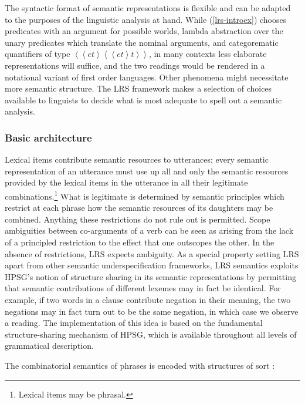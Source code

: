 \documentclass[output=paper]{langsci/langscibook}
\begin{document}

The syntactic format of semantic representations is flexible and can be adapted to the purposes of the linguistic analysis at hand. While (\ref{lrs-introex}) chooses predicates with an argument for possible worlds, lambda abstraction over the unary predicates which translate the nominal arguments, and categorematic quantifiers of type ${\left<\left<et\right>\left<\left<et\right>t\right>\right>}$, in many contexts less elaborate representations will suffice, and the two readings would be rendered in a notational variant of first order languages. Other phenomena might necessitate more semantic structure. The LRS framework makes a selection of choices available to linguists to decide what is most adequate to spell out a semantic analysis.


\subsubsection{Basic architecture}

Lexical items contribute semantic resources to utterances; every semantic representation of an utterance must use up all and only the semantic resources provided by the lexical items in the utterance in all their legitimate combinations.\footnote{Lexical items may be phrasal.} What is legitimate is determined by semantic principles which restrict at each phrase how the semantic resources of its daughters may be combined. Anything these restrictions do not rule out is permitted. Scope ambiguities between co-arguments of a verb can be seen as arising from the lack of a principled restriction to the effect that one outscopes the other. In the absence of restrictions, LRS expects ambiguity. As a special property setting LRS apart from other semantic underspecification frameworks, LRS semantics exploits HPSG's notion of structure sharing in its semantic representations by permitting that semantic contributions of different lexemes may in fact be identical. For example, if two words in a clause contribute negation in their meaning, the two negations may in fact turn out to be the same negation, in which case we observe a  reading. The implementation of this idea is based on the fundamental structure-sharing mechanism of HPSG, which is available throughout all levels of grammatical description.

The combinatorial semantics of phrases is encoded with structures of sort :
\end{document}

